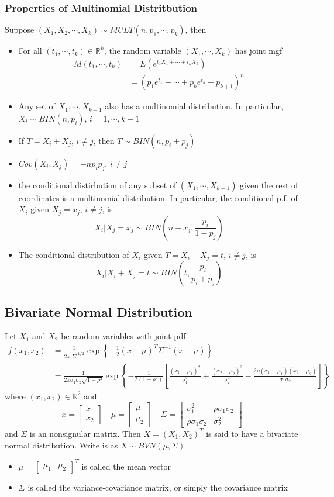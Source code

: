\documentclass[11pt]{article}
\newcommand{\R}{{\mathbb{R}}}
\newcommand{\cv}[1]{\begin{bmatrix} #1 \end{bmatrix}}
\begin{document}
\subsubsection{Properties of Multinomial Distritbution}
Suppose $(X_1,X_2,\cdots,X_k)\sim MULT(n,p_1,\cdots,p_k)$, then
\begin{itemize}
    \item For all $(t_1,\cdots,t_k)\in\R^k$, the random variable $(X_1,\cdots,X_k)$ has joint mgf 
    \begin{align*}
        M(t_1,\cdots,t_k) &= E(e^{t_1X_1+\cdots+t_kX_k}) \\
                          &= (p_1e^{t_1}+\cdots+p_ke^{t_k}+p_{k+1})^n
    \end{align*}
    \item Any set of $X_1,\cdots,X_{k+1}$ also has a multinomial distribution. In particular, $X_i\sim BIN(n,p_i)$, $i=1,\cdots,k+1$
    \item If $T=X_i+X_j$, $i\neq j$, then $T\sim BIN(n,p_i+p_j)$
    \item $Cov(X_i,X_j)=-np_ip_j$, $i\neq j$
    \item the conditional distirbution of any subset of $(X_1,\cdots,X_{k+1})$ given the rest of coordinates is a multinomial distribution. In particular, the conditional p.f. of $X_i$ given $X_j=x_j$, $i\neq j$, is 
    \[X_i|X_j=x_j\sim BIN(n-x_j,\frac{p_i}{1-p_j})\]
    \item The conditional distribution of $X_i$ given $T=X_i+X_j=t$, $i\neq j$, is 
    \[X_i|X_i+X_j=t\sim BIN(t,\frac{p_i}{p_i+p_j})\]
\end{itemize}
\subsection{Bivariate Normal Distribution}
Let $X_1$ and $X_2$ be random variables with joint pdf 
\begin{align*}
    f(x_1, x_2) &= \frac{1}{2 \pi |\Sigma|^{1/2}} \exp \left\{ -\frac{1}{2} (x - \mu)^T \Sigma^{-1} (x - \mu) \right\} \\
                &= \frac{1}{2 \pi \sigma_1 \sigma_2 \sqrt{1 - \rho^2}} \exp \left\{ -\frac{1}{2(1 - \rho^2)} \left[ \frac{(x_1 - \mu_1)^2}{\sigma_1^2} + \frac{(x_2 - \mu_2)^2}{\sigma_2^2} - \frac{2 \rho (x_1 - \mu_1)(x_2 - \mu_2)}{\sigma_1 \sigma_2} \right] \right\}
\end{align*}
where $(x_1,x_2)\in\R^2$ and 
\[x=\cv{x_1\\x_2}\quad \mu=\cv{\mu_1\\\mu_2}\quad \Sigma=\cv{\sigma_1^2 &\rho\sigma_1\sigma_2\\ \rho\sigma_1\sigma_2 &\sigma_2^2}\]
and $\Sigma$ is an nonsignular matrix. Then $X=(X_1,X_2)^T$ is said to have a bivariate normal distribution. Write is as $X\sim BVN(\mu,\Sigma)$
\begin{itemize}
    \item $\mu=\cv{\mu_1&\mu_2}^T$ is called the mean vector 
    \item $\Sigma$ is called the variance-covariance matrix, or simply the covariance matrix 
\end{itemize}
\end{document}
